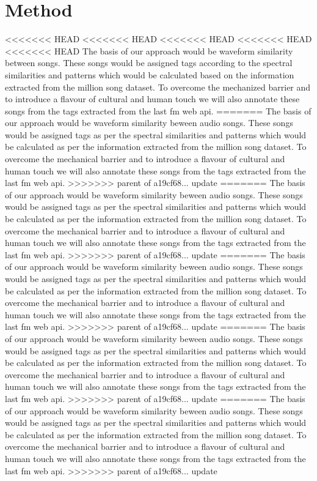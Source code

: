 \documentclass{article}
\begin{document}
\section{Method}

<<<<<<< HEAD
<<<<<<< HEAD
<<<<<<< HEAD
<<<<<<< HEAD
<<<<<<< HEAD
The basis of our approach would be waveform similarity between songs. These songs would be assigned tags according to the spectral similarities and patterns which would be calculated based on the information extracted from the million song dataset. To overcome the mechanized barrier and to introduce a flavour of cultural and human touch we will also annotate these songs from the tags extracted from the last fm web api.
=======
The basis of our approach would be waveform similarity beween audio songs. These songs would be assigned tags as per the spectral similarities and patterns which would be calculated as per the information extracted from the million song dataset. To overcome the mechanical barrier and to introduce a flavour of cultural and human touch we will also annotate these songs from the tags extracted from the last fm web api.
>>>>>>> parent of a19cf68... update
=======
The basis of our approach would be waveform similarity beween audio songs. These songs would be assigned tags as per the spectral similarities and patterns which would be calculated as per the information extracted from the million song dataset. To overcome the mechanical barrier and to introduce a flavour of cultural and human touch we will also annotate these songs from the tags extracted from the last fm web api.
>>>>>>> parent of a19cf68... update
=======
The basis of our approach would be waveform similarity beween audio songs. These songs would be assigned tags as per the spectral similarities and patterns which would be calculated as per the information extracted from the million song dataset. To overcome the mechanical barrier and to introduce a flavour of cultural and human touch we will also annotate these songs from the tags extracted from the last fm web api.
>>>>>>> parent of a19cf68... update
=======
The basis of our approach would be waveform similarity beween audio songs. These songs would be assigned tags as per the spectral similarities and patterns which would be calculated as per the information extracted from the million song dataset. To overcome the mechanical barrier and to introduce a flavour of cultural and human touch we will also annotate these songs from the tags extracted from the last fm web api.
>>>>>>> parent of a19cf68... update
=======
The basis of our approach would be waveform similarity beween audio songs. These songs would be assigned tags as per the spectral similarities and patterns which would be calculated as per the information extracted from the million song dataset. To overcome the mechanical barrier and to introduce a flavour of cultural and human touch we will also annotate these songs from the tags extracted from the last fm web api.
>>>>>>> parent of a19cf68... update
\end{document}
